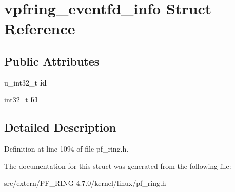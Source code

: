 \hypertarget{structvpfring__eventfd__info}{
\section{vpfring\_\-eventfd\_\-info Struct Reference}
\label{structvpfring__eventfd__info}
}
\subsection*{Public Attributes}
\begin{DoxyCompactItemize}
\item 
\hypertarget{structvpfring__eventfd__info_ae69d68d17a2a0da635dd01623fd77a92}{
u\_\-int32\_\-t {\bfseries id}}
\label{structvpfring__eventfd__info_ae69d68d17a2a0da635dd01623fd77a92}

\item 
\hypertarget{structvpfring__eventfd__info_a5abf0b86d9ebf33486512321402e9b55}{
int32\_\-t {\bfseries fd}}
\label{structvpfring__eventfd__info_a5abf0b86d9ebf33486512321402e9b55}

\end{DoxyCompactItemize}


\subsection{Detailed Description}


Definition at line 1094 of file pf\_\-ring.h.



The documentation for this struct was generated from the following file:\begin{DoxyCompactItemize}
\item 
src/extern/PF\_\-RING-\/4.7.0/kernel/linux/pf\_\-ring.h\end{DoxyCompactItemize}
